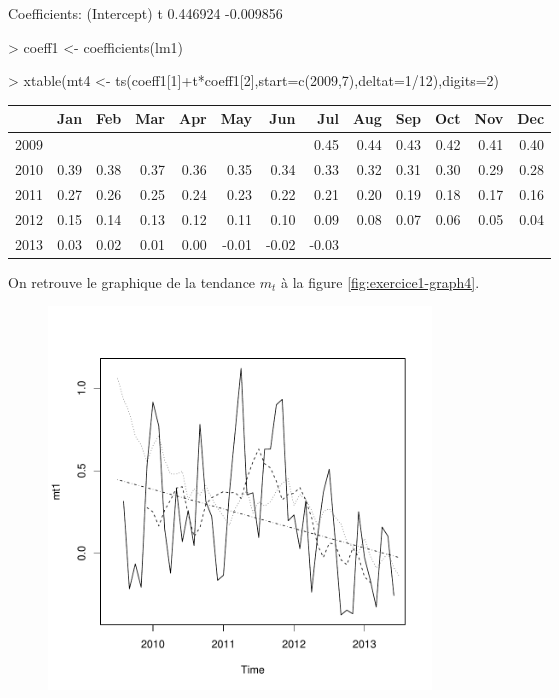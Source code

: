 \begin{solution}{1.1}
\begin{enumerate}
\begin{Schunk}
\begin{Soutput}
Coefficients:
(Intercept)            t
   0.446924    -0.009856
\end{Soutput}
\begin{Sinput}
> coeff1 <- coefficients(lm1)
\end{Sinput}
\end{Schunk}
\begin{Schunk}
\begin{Sinput}
> xtable(mt4 <- ts(coeff1[1]+t*coeff1[2],start=c(2009,7),deltat=1/12),digits=2)
\end{Sinput}
\begin{table}[ht]
\centering
\begin{tabular}{rrrrrrrrrrrrr}
  \hline
 & Jan & Feb & Mar & Apr & May & Jun & Jul & Aug & Sep & Oct & Nov & Dec \\
  \hline
2009 &  &  &  &  &  &  & 0.45 & 0.44 & 0.43 & 0.42 & 0.41 & 0.40 \\
  2010 & 0.39 & 0.38 & 0.37 & 0.36 & 0.35 & 0.34 & 0.33 & 0.32 & 0.31 & 0.30 & 0.29 & 0.28 \\
  2011 & 0.27 & 0.26 & 0.25 & 0.24 & 0.23 & 0.22 & 0.21 & 0.20 & 0.19 & 0.18 & 0.17 & 0.16 \\
  2012 & 0.15 & 0.14 & 0.13 & 0.12 & 0.11 & 0.10 & 0.09 & 0.08 & 0.07 & 0.06 & 0.05 & 0.04 \\
  2013 & 0.03 & 0.02 & 0.01 & 0.00 & -0.01 & -0.02 & -0.03 &  &  &  &  &  \\
   \hline
\end{tabular}
\end{table}\end{Schunk}
On retrouve le graphique de la tendance $m_t$ à la figure \ref{fig:exercice1-graph4}.
\begin{figure}[!ht]
\centering
\includegraphics[height=4in, width=4in]{exercice1-graph4.pdf}

\end{figure}
\end{enumerate}
\end{solution}
